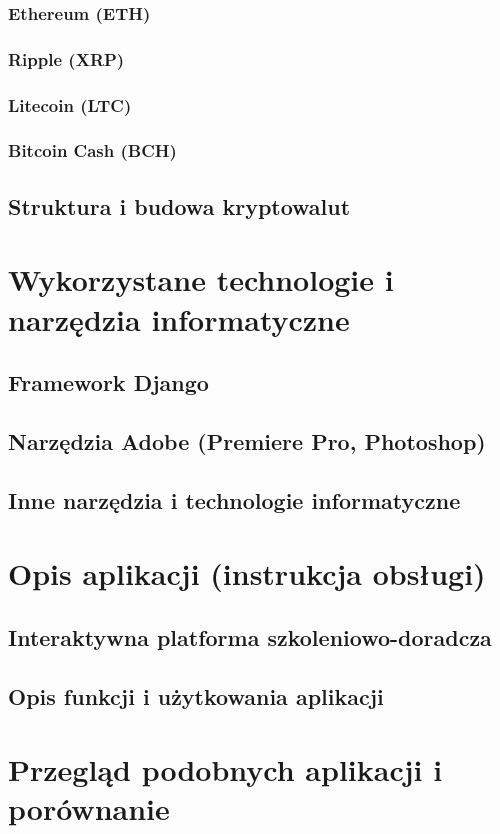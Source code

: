 \documentclass[12pt, a4paper, onside, polish]{article}				%
\begin{document}
\subsubsection{Ethereum (ETH)}
\subsubsection{Ripple (XRP)}
\subsubsection{Litecoin (LTC)}
\subsubsection{Bitcoin Cash (BCH)}
\subsection{Struktura i budowa kryptowalut}

\section{Wykorzystane technologie i narzędzia informatyczne}
\subsection{Framework Django}
\subsection{Narzędzia Adobe (Premiere Pro, Photoshop)}
\subsection{Inne narzędzia i technologie informatyczne}

\section{Opis aplikacji (instrukcja obsługi)}
\subsection{Interaktywna platforma szkoleniowo-doradcza}
\subsection{Opis funkcji i użytkowania aplikacji}

\section{Przegląd podobnych aplikacji i porównanie}
\end{document}
